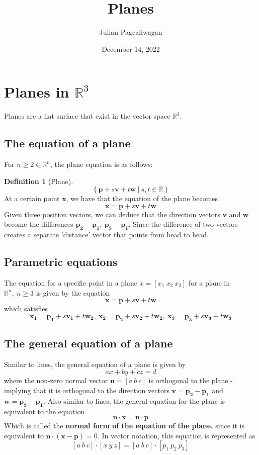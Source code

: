 \documentclass{report}
\title{Planes}
\author{Julian Pagcaliwagan}
\date{December 14, 2022}
\theoremstyle{definition}
\newtheorem{definition}{Definition}
\begin{document}
\maketitle
\section*{Planes in $ \mathbb{R}^3 $}
    Planes are a flat surface that exist in the vector space $ \mathbb{R}^3 $.
    \subsection*{The equation of a plane}
        For $ n \geq 2 \in\mathbb{R}^n $, the plane equation is as follows:
        \begin{definition}[Plane]
            \[
                \left\{ \mathbf{p} + s \mathbf{v} + t \mathbf{w} \ | \ s, t \in \mathbb{R} \right\}
            \]
            At a certain point $ \mathbf{x} $, we have that the equation of the plane becomes
            \[
                \mathbf{x} = \mathbf{p} + s \mathbf{v} + t \mathbf{w}
            \] 
            \noindent Given three position vectors, we can deduce that the direction vectors $ \mathbf{v} $ and $ \mathbf{w} $ become the differences $ \mathbf{p_2 - p_1}, \ \mathbf{p_3 - p_1} $. Since the difference of two vectors creates a separate 'distance' vector that points from head to head.
        \end{definition}    
    \subsection*{Parametric equations}
        The equation for a specific point in a plane $ x = \left[ x_1 \ x_2 \ x_3 \right] $ for a plane in $ \mathbb{R}^n, \ n \geq 3 $ is given by the equation
        \[
            \mathbf{x} = \mathbf{p} + s \mathbf{v} + t \mathbf{w}
        \]
        which satisfies
        \[
            \mathbf{x_1} = \mathbf{p_1} + s \mathbf{v_1} + t \mathbf{w_2}, \ \mathbf{x_2} = \mathbf{p_2} + s \mathbf{v_2} + t \mathbf{w_2}, \ \mathbf{x_3} = \mathbf{p_3} + s \mathbf{v_3} + t \mathbf{w_3}
        \]
    \subsection*{The general equation of a plane}
        Similar to lines, the general equation of a plane is given by
        \[
            ax + by +cz = d
        \]
        where the non-zero normal vector $ \mathbf{n} = \left[ a \ b \ c \right] $ is orthogonal to the plane - implying that it is orthogonal to the direction vectors $ \mathbf{v} = \mathbf{p_2 - p_1} $ and $ \mathbf{w} = \mathbf{p_3 - p_1} $.
        Also similar to lines, the general equation for the plane is equivalent to the equation
        \[
            \mathbf{n} \cdot \mathbf{x} = \mathbf{n} \cdot \mathbf{p}
        \]
        Which is called the \textbf{normal form of the equation of the plane.} since it is equivalent to $ \mathbf{n} \cdot ( \mathbf{x} - \mathbf{p}) = 0 $. In vector notation, this equation is represented as
        \[
            \left[ a \ b \ c \right] \cdot \left[ x \ y \ z \right] = \left[ a \ b \ c \right] \cdot \left[ p_1 \ p_2 \ p_3 \right]
        \]
\end{document}
